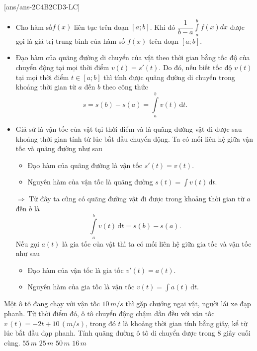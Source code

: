 [ans/ans-2C4B2CD3-LC]
    \begin{itemize}
        \item Cho hàm số$f\left(x \right)$ liên tục trên đoạn $\left[a;b \right]$. Khi đó $\dfrac{1}{b-a}\displaystyle\int\limits_a^b{f\left(x \right)dx}$ được gọi là giá trị trung bình của hàm số $f\left(x \right)$ trên đoạn $\left[a;b \right]$.
        \item Đạo hàm của quãng đường di chuyển của vật theo thời gian bằng tốc độ của chuyển động tại mọi thời điểm $v(t)=s'(t)$. Do đó, nếu biết tốc độ $v(t)$ tại mọi thời điểm $t\in \left[a;b \right]$ thì tính được quãng đường di chuyển trong khoảng thời gian từ $a$ đến $b$ theo công thức
        $$s=s\left(b \right)-s\left(a \right)=\displaystyle\int\limits_a^b v(t)\mathrm{\,d}t.$$
        \item Giả sử là vận tốc của vật tại thời điểm và là quãng đường vật đi được sau khoảng thời gian tính từ lúc bắt đầu chuyển động. Ta có mối liên hệ giữa vận tốc và quãng đường như sau
        \begin{itemize}
            \item Đạo hàm của quãng đường là vận tốc $s'(t)=v(t)$.
            \item Nguyên hàm của vận tốc là quãng đường $s(t)= \displaystyle\int v(t)\mathrm{\,d}t$.
        \end{itemize}
        $\Rightarrow$ Từ đây ta cũng có quãng đường vật đi được trong khoảng thời gian từ $a$ đến $b$ là 
        $$\displaystyle\int\limits_a^b v(t)\mathrm{\,d}t=s(b)-s(a).$$ 
        Nếu gọi $a(t)$ là gia tốc của vật thì ta có mối liên hệ giữa gia tốc và vận tốc như sau
        \begin{itemize}
            \item Đạo hàm của vận tốc là gia tốc $v'(t)=a(t)$.
            \item Nguyên hàm của gia tốc là vận tốc $v(t)= \displaystyle\int a(t)\mathrm{\,d}t$.
        \end{itemize}
    \end{itemize}

\TN
\begin{ex}%
    Một ô tô đang chạy với vận tốc $10\,m/s$ thì gặp chướng ngại vật, người lái xe đạp phanh. Từ thời điểm đó, ô tô chuyển động chậm dần đều với vận tốc $v\,\left(t \right)=-2t+10\,\left(m/s \right)$, trong đó $t$ là khoảng thời gian tính bằng giây, kể từ lúc bắt đầu đạp phanh. Tính quãng đường ô tô di chuyển được trong $8$ giây cuối cùng.
    \choice
    {\True $55\,m$}
    {$25\,m$}
    {$50\,m$}
    {$16\,m$}
\end{ex}

